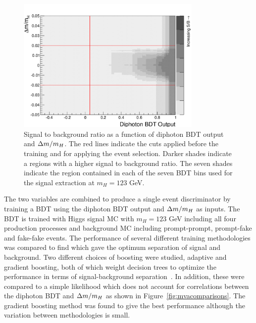 \begin{figure}
\begin{center}
  \includegraphics[width=0.8\textwidth]{hgg7TeV/sidebandMvaPlots/bdt2dplot.png}
\end{center}
 \caption{Signal to background ratio as a function of diphoton BDT output and $\Delta m/m_{H}$.
 The red lines indicate the cuts applied before the training and for applying the event selection. 
Darker shades indicate a regions with a higher signal to background ratio. The seven shades indicate the 
region contained in each of the seven BDT bins used for the signal extraction at $m_{H}= 123$ GeV.}
 \label{fig:bdtplane}
\end{figure}

The two variables are combined to produce a single event discriminator by training a BDT using the 
diphoton BDT output and $\Delta m/m_{H}$ as inputs. 
The BDT is trained with Higgs signal MC with $m_{H}=123$ GeV including all four production processes 
and background MC including prompt-prompt, prompt-fake and fake-fake events.
The performance of several different training methodologies was compared to find which gave the 
optimum separation of signal and background.
Two different choices of boosting were studied, adaptive and gradient boosting, both of which 
weight decision trees to optimize the performance in terms of signal-background separation~\citep{tmva}. 
In addition, these were compared to a simple likelihood 
which does not account for correlations between the 
diphoton BDT and $\Delta m/m_{H}$ as shown in Figure~\ref{fig:mvacomparisons}.
The gradient boosting method was found to give the best performance although the variation between 
methodologies is small.
 
